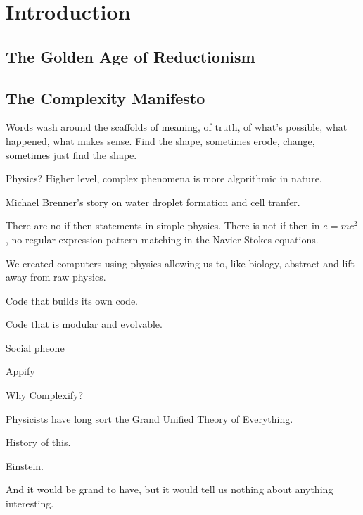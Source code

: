 \section{Introduction}


\subsection{The Golden Age of Reductionism}


\subsection{The Complexity Manifesto}


Words wash around the scaffolds of meaning, of truth,
of what's possible, what happened, what makes sense.
Find the shape, sometimes erode, change,
sometimes just find the shape.




Physics?
Higher level, complex phenomena is more algorithmic in nature.

Michael Brenner's story on water droplet formation
and cell tranfer.

There are no if-then statements in simple physics.
There is not if-then in $e=mc^2$, no regular
expression pattern matching in the Navier-Stokes equations.

We created computers using physics allowing us to, like biology,
abstract and lift away from raw physics.


\usepackage{lipsum}
\usepackage[framemethod=default]{mdframed}




\begin{myframe}
\lipsum[1]
\end{myframe}




Code that builds its own code.

Code that is modular and evolvable.

Social pheone


Appify


Why Complexify?


Physicists have
long sort the Grand Unified Theory of Everything.

History of this.

Einstein.

And it would be grand to have, but it would
tell us nothing about anything interesting.

